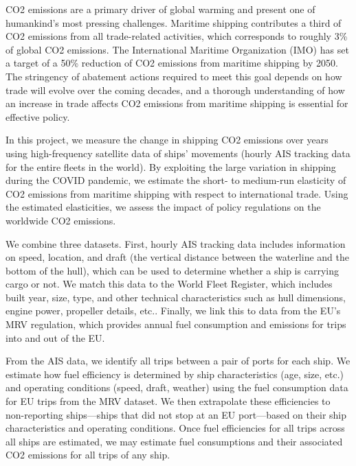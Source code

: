 \documentclass[hidelinks, 12pt,letterpaper]{article}
\begin{document}

 
CO2 emissions are a primary driver of global warming and present one of humankind's most pressing challenges. Maritime shipping contributes a third of CO2 emissions from all trade-related activities, which corresponds to roughly 3\% of global CO2 emissions. The International Maritime Organization (IMO) has set a target of a 50\% reduction of CO2 emissions from maritime shipping by 2050. The stringency of abatement actions required to meet this goal depends on how trade will evolve over the coming decades, and a thorough understanding of how an increase in trade affects CO2 emissions from maritime shipping is essential for effective policy. 

In this project, we measure the change in shipping CO2 emissions over years using high-frequency satellite data of ships’ movements (hourly AIS tracking data for the entire fleets in the world). By exploiting the large variation in shipping during the COVID pandemic, we estimate the short- to medium-run elasticity of CO2 emissions from maritime shipping with respect to international trade. Using the estimated elasticities, we assess the impact of policy regulations on the worldwide CO2 emissions. 

We combine three datasets. First, hourly AIS tracking data includes information on speed, location, and draft (the vertical distance between the waterline and the bottom of the hull), which can be used to determine whether a ship is carrying cargo or not. We match this data to the World Fleet Register, which includes built year, size, type, and other technical characteristics such as hull dimensions, engine power, propeller details, etc.. Finally, we link this to data from the EU’s MRV regulation, which provides annual fuel consumption and emissions for trips into and out of the EU. 

From the AIS data, we identify all trips between a pair of ports for each ship. We estimate how fuel efficiency is determined by ship characteristics (age, size, etc.) and operating conditions (speed, draft, weather) using the fuel consumption data for EU trips from the MRV dataset. We then extrapolate these efficiencies to non-reporting ships—ships that did not stop at an EU port—based on their ship characteristics and operating conditions. Once fuel efficiencies for all trips across all ships are estimated, we may estimate fuel consumptions and their associated CO2 emissions for all trips of any ship. 
\end{document}
